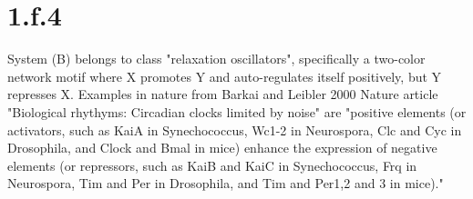 \documentclass{article}
\begin{document}
\section{1.f.4}

System (B) belongs to class "relaxation oscillators", specifically a two-color network motif where X promotes Y and auto-regulates itself positively, but Y represses X. Examples in nature from Barkai and Leibler 2000 Nature article "Biological rhythyms: Circadian clocks limited by noise" are "positive elements (or activators, such as KaiA in Synechococcus, Wc1-2 in Neurospora, Clc and Cyc in Drosophila, and Clock and Bmal in mice) enhance the expression of negative elements (or repressors, such as KaiB and KaiC in Synechococcus, Frq in Neurospora, Tim and Per in Drosophila, and Tim and Per1,2 and 3 in mice)."
\end{document}
